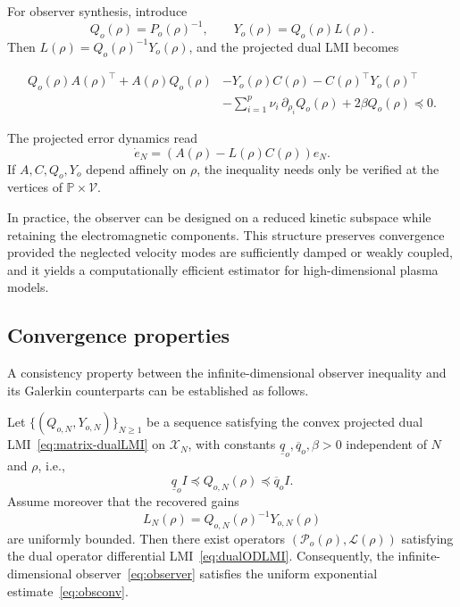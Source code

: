 \documentclass[AMA,Times2COL]{WileyNJDv5}
\begin{document}
For observer synthesis, introduce
\[
Q_o(\rho)=P_o(\rho)^{-1},
\qquad
Y_o(\rho)=Q_o(\rho)L(\rho).
\]
Then \(L(\rho)=Q_o(\rho)^{-1}Y_o(\rho)\), and the projected dual LMI becomes

\begin{equation}\label{eq:matrix-dualLMI}
\begin{aligned}
Q_o(\rho)A(\rho)^\top + A(\rho)Q_o(\rho)
&-Y_o(\rho)C(\rho)-C(\rho)^\top Y_o(\rho)^\top 
\\
&
-\sum_{i=1}^p \nu_i\,\partial_{\rho_i}Q_o(\rho)
+2\beta Q_o(\rho)
\preceq 0 .
\end{aligned}
\end{equation}

The projected error dynamics read
\[
\dot e_N = (A(\rho)-L(\rho)C(\rho))e_N .
\]
If $A,C,Q_o,Y_o$ depend affinely on $\rho$,
the inequality needs only be verified at the vertices of
$\mathbb P\times\mathcal V$.

\begin{remark}
In practice, the observer can be designed on a reduced kinetic subspace while retaining the electromagnetic components. This structure preserves convergence
provided the neglected velocity modes are sufficiently damped or weakly coupled, and it yields a computationally efficient estimator for high-dimensional plasma
models.
\end{remark}

\subsection{Convergence properties}

A consistency property between the infinite-dimensional observer inequality and its Galerkin counterparts can be established as follows.

\begin{theorem}
\label{thm:limitobs}
Let $\{(Q_{o,N},Y_{o,N})\}_{N\ge1}$ be a sequence satisfying the convex projected dual LMI~\eqref{eq:matrix-dualLMI} on $\mathscr X_N$, with constants $\underline q_o,\overline q_o,\beta>0$ independent of $N$ and $\rho$, i.e.,
\[
\underline q_o I \preceq Q_{o,N}(\rho)\preceq \overline q_o I .
\]
Assume moreover that the recovered gains
\[
L_N(\rho)=Q_{o,N}(\rho)^{-1}Y_{o,N}(\rho)
\]
are uniformly bounded. Then there exist operators
$(\mathcal P_o(\rho),\mathcal L(\rho))$ satisfying the dual operator differential LMI~\eqref{eq:dualODLMI}. Consequently, the infinite-dimensional observer~\eqref{eq:observer} satisfies the uniform
exponential estimate~\eqref{eq:obsconv}.
\end{theorem}
\end{document}
